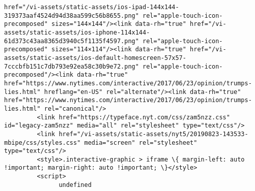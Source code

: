 \documentclass[11pt]{article}
\begin{document}
\begin{Verbatim}[commandchars=\\\{\}]
href="/vi-assets/static-assets/ios-ipad-144x144-319373aaf4524d94d38aa599c56b8655.png" rel="apple-touch-icon-precomposed" sizes="144×144"/><link data-rh="true" href="/vi-assets/static-assets/ios-iphone-114x144-61d373c43aa8365d3940c5f1135f4597.png" rel="apple-touch-icon-precomposed" sizes="114×114"/><link data-rh="true" href="/vi-assets/static-assets/ios-default-homescreen-57x57-7cccbfb151c7db793e92ea58c30b9e72.png" rel="apple-touch-icon-precomposed"/><link data-rh="true" href="https://www.nytimes.com/interactive/2017/06/23/opinion/trumps-lies.html" hreflang="en-US" rel="alternate"/><link data-rh="true" href="https://www.nytimes.com/interactive/2017/06/23/opinion/trumps-lies.html" rel="canonical"/>
         <link href="https://typeface.nyt.com/css/zam5nzz.css" id="legacy-zam5nzz" media="all" rel="stylesheet" type="text/css"/>
         <link href="/vi-assets/static-assets/nyt5/20190823-143533-mbipe/css/styles.css" media="screen" rel="stylesheet" type="text/css"/>
         <style>.interactive-graphic > iframe \{ margin-left: auto !important; margin-right: auto !important; \}</style>
         <script>
               undefined

\end{Verbatim}
\end{document}
